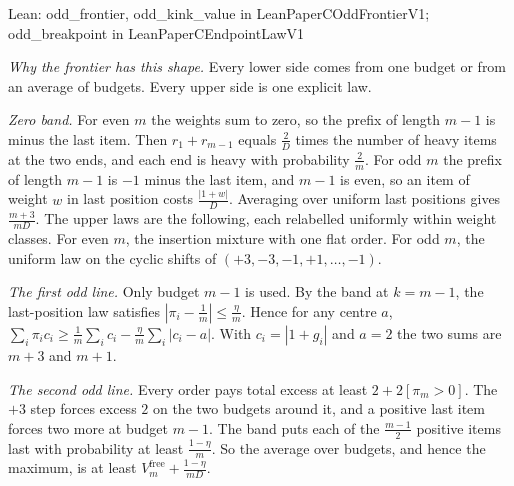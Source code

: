 \documentclass[conference]{IEEEtran}
\theoremstyle{definition}
\newcommand{\lean}[1]{\textsf{\footnotesize #1}}
\newcommand{\leanbox}[1]{%
  \par\vspace{2pt}\noindent
  {\raggedright\footnotesize\textsf{Lean: #1}\par}\vspace{2pt}}
\begin{document}
\leanbox{\lean{odd\_frontier}, \lean{odd\_kink\_value} in \lean{LeanPaperCOddFrontierV1};
\lean{odd\_breakpoint} in \lean{LeanPaperCEndpointLawV1}}

\emph{Why the frontier has this shape.} Every lower side comes from one budget or from an
average of budgets. Every upper side is one explicit law.

\emph{Zero band.} For even $m$ the weights sum to zero, so the prefix of length $m-1$ is minus
the last item. Then $r_{1}+r_{m-1}$ equals $\frac{2}{D}$ times the number of heavy items at
the two ends, and each end is heavy with probability $\frac{2}{m}$. For odd $m$ the prefix
of length $m-1$ is $-1$ minus the last item, and $m-1$ is even, so an item of weight $w$ in
last position costs $\frac{|1+w|}{D}$. Averaging over uniform last positions gives
$\frac{m+3}{mD}$. The upper laws are the following, each relabelled uniformly within weight
classes. For even $m$, the insertion mixture with one flat order. For odd $m$, the uniform
law on the cyclic shifts of $(+3,-3,-1,+1,\dots,-1)$.

\emph{The first odd line.} Only budget $m-1$ is used. By the band at $k=m-1$, the
last-position law satisfies $|\pi_{i}-\frac1m|\le\frac{\eta}{m}$. Hence for any centre $a$,
$\sum_{i}\pi_{i}c_{i}\ge\frac1m\sum_{i}c_{i}-\frac{\eta}{m}\sum_{i}|c_{i}-a|$. With
$c_{i}=|1+g_{i}|$ and $a=2$ the two sums are $m+3$ and $m+1$.

\emph{The second odd line.} Every order pays total excess at least $2+2[\pi_{m}>0]$. The
$+3$ step forces excess $2$ on the two budgets around it, and a positive last item forces two
more at budget $m-1$. The band puts each of the $\frac{m-1}{2}$ positive items last with
probability at least $\frac{1-\eta}{m}$. So the average over budgets, and hence the maximum,
is at least $V^{\mathrm{free}}_{m}+\frac{1-\eta}{mD}$.
\end{document}
